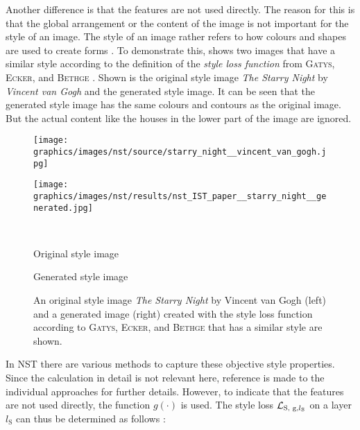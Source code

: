Another difference is that the features are not used directly. The reason for this is that the global arrangement or the content of the image is not important for the style of an image. The style of an image rather refers to how colours and shapes are used to create forms \cite{Glas2021}. To demonstrate this,  shows two images that have a similar style according to the definition of the \emph{style loss function} from \textsc{Gatys}, \textsc{Ecker}, and \textsc{Bethge} \cite{GEB2016}. Shown is the original style image \emph{The Starry Night} by \emph{Vincent van Gogh} and the generated style image. It can be seen that the generated style image has the same colours and contours as the original image. But the actual content like the houses in the lower part of the image are ignored.
\begin{figure}[h]
	\centering
	\begin{minipage}{.5\textwidth}
		\centering
		\texttt{[image: graphics/images/nst/source/starry\_night\_\_vincent\_van\_gogh.jpg]}
	\end{minipage}%
	\begin{minipage}{.5\textwidth}
		\centering
		\texttt{[image: graphics/images/nst/results/nst\_IST\_paper\_\_starry\_night\_\_generated.jpg]}
	\end{minipage}\\ \vspace{0.15cm}
	\begin{minipage}{.5\textwidth}
		\centering
		Original style image
	\end{minipage}%
	\begin{minipage}{.5\textwidth}
		\centering
		Generated style image
	\end{minipage}
	\caption{An original style image \emph{The Starry Night} by Vincent van Gogh (left) and a generated image (right) created with the style loss function according to \textsc{Gatys}, \textsc{Ecker}, and \textsc{Bethge}\cite{GEB2016} that has a similar style are shown.}
	\label{fig:generated_style_nst}
\end{figure} 
In \gls{NST} there are various methods to capture these objective style properties. Since the calculation in detail is not relevant here, reference is made to the individual approaches for further details\cite{GEB2016,LW2016}. However, to indicate that the features are not used directly, the function $g(\cdot)$ is used. The style loss $\mathcal{L}_{\text{S, g}, l_\text{S}}$ on a layer $l_\text{S}$ can thus be determined as follows \cite{GEB2016}:
